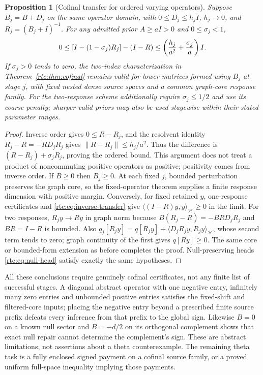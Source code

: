 \documentclass[11pt,a4paper]{article}
\numberwithin{equation}{section}
\newtheorem{proposition}[theorem]{Proposition}
\theoremstyle{definition}\newtheorem{definition}[theorem]{Definition}
\theoremstyle{remark}\newtheorem{remark}[theorem]{Remark}
\newcommand{\Hh}{\mathcal H}\newcommand{\Hw}{\mathcal H}
\newcommand{\ip}[2]{\langle#1,#2\rangle}\newcommand{\norm}[1]{\lVert#1\rVert}\newcommand{\abs}[1]{\lvert#1\rvert}
\begin{document}
\begin{proposition}[Cofinal transfer for ordered varying operators]\label{rtc:prop:varying}
Suppose $B_j=B+D_j$ on the same operator domain, with
$0\le D_j\le h_jI$, $h_j\to0$, and $R_j=(B_j+I)^{-1}$.
For any admitted prior $A\ge aI>0$ and $0\le\sigma_j<1$,
\begin{equation}\label{rtc:eq:inverse-transfer}
 0\le[I-(1-\sigma_j)R_j]-(I-R)
 \le\left({h_j\over a^2}+{\sigma_j\over a}\right)I.
\end{equation}
If $\sigma_j>0$ tends to zero, the two-index characterization in
Theorem~\ref{rtc:thm:cofinal} remains valid for lower matrices formed
using $B_j$ at stage $j$, with fixed nested dense source spaces and a
common graph-core response family. For the two-response scheme additionally require $\sigma_j\le1/2$ and
use its coarse penalty; sharper valid priors may also be used stagewise
within their stated parameter ranges.
\end{proposition}
\begin{proof}
Inverse order gives $0\le R-R_j$, and the resolvent identity
$R_j-R=-RD_jR_j$ gives $\norm{R-R_j}\le h_j/a^2$.
Thus the difference is $(R-R_j)+\sigma_jR_j$, proving the ordered bound.
This argument does not treat a product of noncommuting positive operators
as positive; positivity comes from inverse order.
If $B\ge0$ then $B_j\ge0$. At each fixed $j$, bounded perturbation
preserves the graph core, so the fixed-operator theorem supplies a finite
response dimension with positive margin.
Conversely, for fixed retained $y$, one-response certificates and
\eqref{rtc:eq:inverse-transfer} give $\ip{(I-R)y}y_{\Hh}\ge0$ in the
limit. For two responses, $R_jy\to Ry$ in graph norm because
$B(R_j-R)=-BRD_jR_j$ and $BR=I-R$ is bounded.
Also
$q_j[R_jy]=q[R_jy]+\ip{D_jR_jy}{R_jy}_{\Hh}$,
whose second term tends to zero; graph continuity of the first gives
$q[Ry]\ge0$. The same core or bounded-form extension as before completes
the proof. Null-preserving heads \eqref{rtc:eq:null-head} satisfy exactly
the same hypotheses.
\end{proof}
All these conclusions require genuinely cofinal certificates, not any
finite list of successful stages. A diagonal abstract operator with one
negative entry, infinitely many zero entries and unbounded positive entries
satisfies the fixed-shift and filtered-core inputs; placing the negative
entry beyond a prescribed finite source prefix defeats every inference
from that prefix to the global sign. Likewise $B=0$ on a known null sector
and $B=-d/2$ on its orthogonal complement shows that exact null repair
cannot determine the complement's sign. These are abstract limitations,
not assertions about a theta counterexample. The remaining theta task is
a fully enclosed signed payment on a cofinal source family, or a proved
uniform full-space inequality implying those payments.
\end{document}
